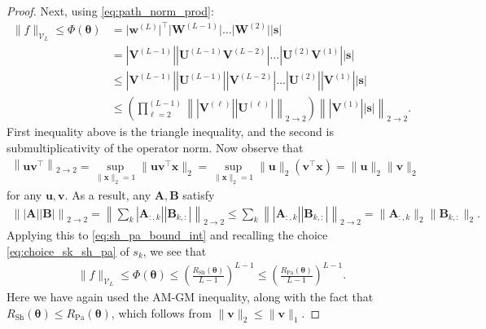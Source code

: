 \documentclass{article}
\def\vtheta{{\bm{\theta}}}
\def\vs{{\bm{s}}}
\def\vu{{\bm{u}}}
\def\vv{{\bm{v}}}
\def\vw{{\bm{w}}}
\def\vx{{\bm{x}}}
\def\mA{{\bm{A}}}
\def\mB{{\bm{B}}}
\def\mU{{\bm{U}}}
\def\mV{{\bm{V}}}
\def\mW{{\bm{W}}}
\def\cV{{\mathcal{V}}}
\begin{document}
\begin{appendices}
\begin{proof}
    Next, using \eqref{eq:path_norm_prod}: 
    \begin{align} \label{eq:sh_pa_bound_int}
        \| f \|_{\cV_L} \leq \Phi(\vtheta) &=  \big| \vw^{(L)} \big|^\top \big| \mW^{(L-1)} \big| \dots \big| \mW^{(2)} \big| |\vs| \\
        &= \left| \mV^{(L-1)} \right| \left| \mU^{(L-1)} \mV^{(L-2)} \right| \dots \left| \mU^{(2)} \mV^{(1)} \right| |\vs| \\
        &\leq \left| \mV^{(L-1)} \right| \left| \mU^{(L-1)} \right| \left| \mV^{(L-2)} \right| \dots \left| \mU^{(2)} \right| \left| \mV^{(1)} \right| |\vs| \\
        &\leq \left( \prod_{\ell=2}^{(L-1)} \left\| \left| \mV^{(\ell)} \right| \left| \mU^{(\ell)} \right|  \right\|_{2 \to 2} \right) \left\| \left| \mV^{(1)} \right| |\vs| \right\|_{2 \to 2}.
    \end{align}
    First inequality above is the triangle inequality, and the second is submultiplicativity of the operator norm. Now observe that
    \begin{align}
        \left\| \vu \vv^\top \right\|_{2 \to 2} = \sup_{\| \vx \|_2 = 1} \| \vu \vv^\top \vx \|_2 = \sup_{\| \vx \|_2 = 1}  \| \vu  \|_2 \left( \vv^\top \vx \right) = \| \vu \|_2 \| \vv \|_2
    \end{align}
    for any $\vu, \vv$. As a result, any $\mA, \mB$ satisfy
    \begin{align}
        \left\| |\mA| |\mB| \right\|_{2 \to 2} = \left\| \sum_k |\mA_{:,k}| |\mB_{k,:}| \right\|_{2 \to 2} \leq  \sum_k \left\| |\mA_{:,k}| |\mB_{k,:}| \right\|_{2 \to 2} = \| \mA_{:,k} \|_2 \| \mB_{k,:} \|_2.
    \end{align}
    Applying this to \eqref{eq:sh_pa_bound_int} and recalling the choice \eqref{eq:choice_sk_sh_pa} of $s_k$, we see that
    \begin{align}
        \| f \|_{\cV_L} \leq \Phi(\vtheta) \leq \left( \frac{R_{\mathrm{Sh}}(\vtheta)}{L-1} \right)^{L-1} \leq \left( \frac{R_{\mathrm{Pa}}(\vtheta)}{L-1} \right)^{L-1}.
    \end{align}
    Here we have again used the AM-GM inequality, along with the fact that $R_{\mathrm{Sh}}(\vtheta) \leq R_{\mathrm{Pa}}(\vtheta)$, which follows from $\| \vv \|_2 \leq \| \vv \|_1$.
\end{proof}




\end{appendices}
\end{document}

